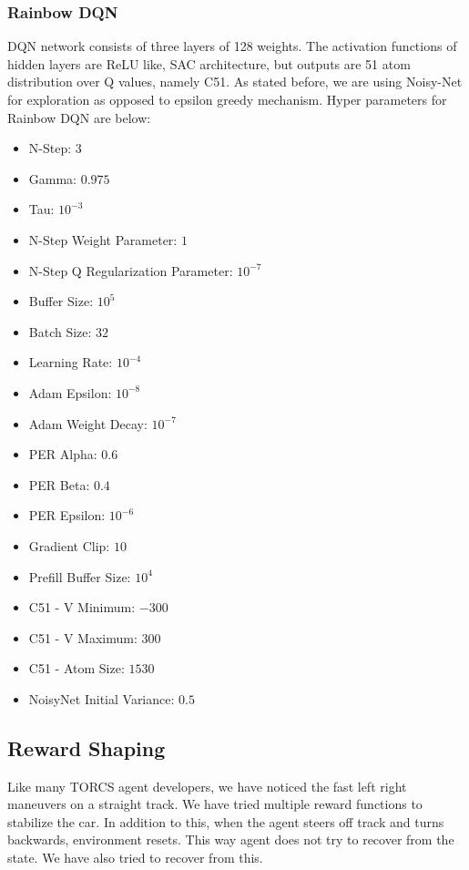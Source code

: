 \documentclass[conference]{IEEEtran}
\begin{document}
\subsubsection{Rainbow DQN}
DQN network consists of three layers of 128 weights. The activation functions of hidden layers are ReLU like, SAC architecture, but outputs are 51 atom distribution over Q values, namely C51. As stated before, we are using Noisy-Net for exploration as opposed to epsilon greedy mechanism. Hyper parameters for Rainbow DQN are below:

\begin{itemize}
    \item N-Step: $3$
    \item Gamma: $0.975$
    \item Tau: $10^{-3}$
    \item N-Step Weight Parameter: $1$
    \item N-Step Q Regularization Parameter: $10^{-7}$
    \item Buffer Size: $10^5$
    \item Batch Size: $32$
    \item Learning Rate: $10^{-4}$
    \item Adam Epsilon: $10^{-8}$
    \item Adam Weight Decay: $10^{-7}$
    \item PER Alpha: $0.6$
    \item PER Beta: $0.4$
    \item PER Epsilon: $10^{-6}$
    \item Gradient Clip: $10$
    \item Prefill Buffer Size: $10^{4}$
    \item C51 - V Minimum: $-300$
    \item C51 - V Maximum: $300$
    \item C51 - Atom Size: $1530$
    \item NoisyNet Initial Variance: $0.5$
\end{itemize}

\subsection{Reward Shaping}
Like many TORCS agent developers, we have noticed the fast left right maneuvers on a straight track. We have tried multiple reward functions to stabilize the car. In addition to this, when the agent steers off track and turns backwards, environment resets. This way agent does not try to recover from the state. We have also tried to recover from this.
\end{document}

